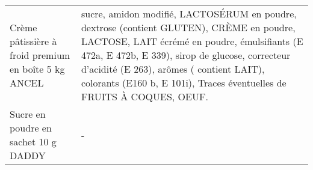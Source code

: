 \begin{longtable}{p{5cm}p{10cm}}
                                                     Crème pâtissière à froid premium en boîte 5 kg ANCEL &                                                                                                                                                                                                                                                                                                                                                                                                                                                                                                                                                                                                                                                                                                                        sucre, amidon modifié, LACTOSÉRUM en poudre, dextrose (contient GLUTEN), CRÈME en poudre, LACTOSE, LAIT écrémé en poudre, émulsifiants (E 472a, E 472b, E 339), sirop de glucose, correcteur d'acidité (E 263), arômes ( contient LAIT), colorants (E160 b, E 101i), Traces éventuelles de FRUITS À COQUES, OEUF. \\
                                                                     Sucre en poudre en sachet 10 g DADDY &                                                                                                                                                                                                                                                                                                                                                                                                                                                                                                                                                                                                                                                                                                                                                                                                                                                                                                                                                                                                                                        - \\

\end{longtable}
